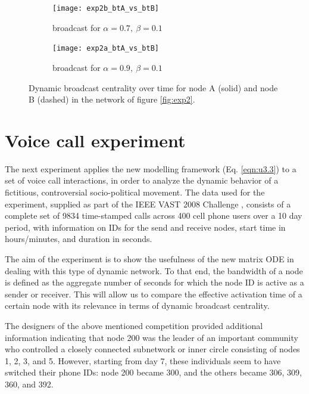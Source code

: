 \begin{figure}
     \centering
     \begin{subfigure}[b]{0.49\textwidth}
         \centering
         \texttt{[image: exp2b\_btA\_vs\_btB]}
         \caption{broadcast for $\alpha = 0.7 ,~\beta = 0.1$}
         \label{fig:bt5}
     \end{subfigure}
     \hfill
     \begin{subfigure}[b]{0.49\textwidth}
         \centering
         \texttt{[image: exp2a\_btA\_vs\_btB]}
         \caption{broadcast for $\alpha = 0.9 ,~\beta = 0.1$}
         \label{fig:bt6}
     \end{subfigure}
     \caption{Dynamic broadcast centrality over time for node A (solid) and node B (dashed) in the network of figure \ref{fig:exp2}.}
     \label{fig:twobt}
\end{figure}

\section{Voice call experiment}
\label{sec:voicecall}
The next experiment applies the new modelling framework (Eq. \ref{eqn:u3.3}) to a set of voice call interactions, in order to analyze the dynamic behavior of a fictitious, controversial socio-political movement. The data used for the experiment, supplied as part of the IEEE VAST 2008 Challenge \cite{grinstein2008vast}, consists of a complete set of 9834 time-stamped calls across 400 cell phone users over a 10 day period, with information on IDs for the send and receive nodes, start time in hours/minutes, and duration in seconds.

The aim of the experiment is to show the usefulness of the new matrix ODE in dealing with this type of dynamic network. To that end, the bandwidth of a node is defined as the aggregate number of seconds for which the node ID is active as a sender or receiver. This will allow us to compare the effective activation time of a certain node with its relevance in terms of dynamic broadcast centrality.

The designers of the above mentioned competition provided additional information indicating that node 200 was the leader of an important community who controlled a closely connected subnetwork or inner circle consisting of nodes 1, 2, 3, and 5. However, starting from day 7, these individuals seem to have switched their phone IDs: node 200 became 300, and the others became 306, 309, 360, and 392.


